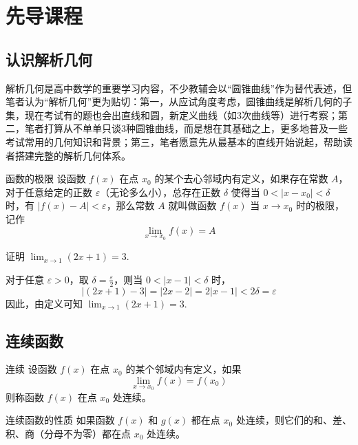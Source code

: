 \chapter{先导课程}
\section{认识解析几何}
解析几何是高中数学的重要学习内容，不少教辅会以“圆锥曲线”作为替代表述，但笔者认为“解析几何”更为贴切：第一，从应试角度考虑，圆锥曲线是解析几何的子集，现在考试有的题也会出直线和圆，新定义曲线（如3次曲线等）进行考察；第二，笔者打算从不单单只谈3种圆锥曲线，而是想在其基础之上，更多地普及一些考试常用的几何知识和背景；第三，笔者愿意先从最基本的直线开始说起，帮助读者搭建完整的解析几何体系。

\begin{definition}{函数的极限}
设函数 \( f(x) \) 在点 \( x_0 \) 的某个去心邻域内有定义，如果存在常数 \( A \)，对于任意给定的正数 \( \varepsilon \)（无论多么小），总存在正数 \( \delta \) 使得当 \( 0 < |x - x_0| < \delta \) 时，有 \( |f(x) - A| < \varepsilon \)，那么常数 \( A \) 就叫做函数 \( f(x) \) 当 \( x \to x_0 \) 时的极限，记作
\[ \lim_{x \to x_0} f(x) = A \]
\end{definition}

\begin{example}
证明 \( \lim_{x \to 1} (2x + 1) = 3 \).
\end{example}

\begin{solution}
对于任意 \( \varepsilon > 0 \)，取 \( \delta = \frac{\varepsilon}{2} \)，则当 \( 0 < |x - 1| < \delta \) 时，
\[ |(2x + 1) - 3| = |2x - 2| = 2|x - 1| < 2\delta = \varepsilon \]
因此，由定义可知 \( \lim_{x \to 1} (2x + 1) = 3 \).
\end{solution}

\section{连续函数}

\begin{definition}{连续}
设函数 \( f(x) \) 在点 \( x_0 \) 的某个邻域内有定义，如果
\[ \lim_{x \to x_0} f(x) = f(x_0) \]
则称函数 \( f(x) \) 在点 \( x_0 \) 处连续。
\end{definition}

\begin{theorem}{连续函数的性质}
如果函数 \( f(x) \) 和 \( g(x) \) 都在点 \( x_0 \) 处连续，则它们的和、差、积、商（分母不为零）都在点 \( x_0 \) 处连续。
\end{theorem}
